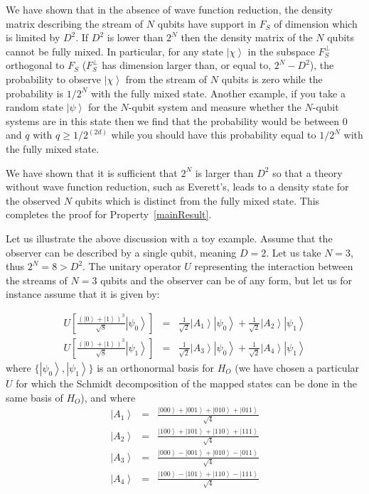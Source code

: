 \documentclass[11pt,amsmath,amssymb,latexsym,a4paper]{article}
\newcommand{\ket}[1]{\left|{#1}\right>}
\newcommand{\highlight}[1] {#1}
\begin{document}
We have shown that in the absence of wave function reduction, the density matrix describing the stream of $N$ qubits have support in $F_S$ of dimension which is limited by $D^2$. If $D^2$ is lower than $2^N$ then the density matrix of the $N$ qubits cannot be fully mixed. In particular, for any state $\ket{\chi}$ in the subspace $F_S^\perp$ orthogonal to $F_S$ ($F_S^\perp$ has dimension larger than, or equal to, $2^N-D^2$), the probability to observe $\ket{\chi}$ from the stream of $N$ qubits is zero while the probability is $1/2^N$ with the fully mixed state. \highlight{Another example, if you take a random state $\ket{\psi}$ for the $N$-qubit system and measure whether the $N$-qubit systems are in this state then we find that the probability would be between 0 and $q$ with $q \geq 1/2^{(2d)}$ while you should have this probability equal to $1/2^N$ with the fully mixed state.}

We have shown that it is sufficient that $2^N$ is larger than $D^2$ so that a theory without wave function reduction, such as Everett's, leads to a density state for the observed $N$ qubits which is distinct from the fully mixed state. This completes the proof for Property~\ref{mainResult}.

Let us illustrate the above discussion with a toy example. Assume that the observer can be described by a single qubit, meaning $D=2$. Let us take $N=3$, thus $2^N = 8 > D^2$. The unitary operator $U$ representing the interaction between the streams of $N=3$ qubits and the observer can be of any form, but let us for instance assume that it is given by:


\begin{eqnarray}
U \highlight{\left[\frac{(\ket{0}+\ket{1})^3}{\sqrt{8}}\ket{\psi_0}\right]} &=&  \frac{1}{\sqrt{2}}\ket{A_1}\ket{\psi_0} +  \frac{1}{\sqrt{2}}\ket{A_2}\ket{\psi_1}\label{Ex1}\\
U \highlight{\left[\frac{(\ket{0}+\ket{1})^3}{\sqrt{8}}\ket{\psi_1} \right]}&=&  \frac{1}{\sqrt{2}}\ket{A_3}\ket{\psi_0} +  \frac{1}{\sqrt{2}}\ket{A_4}\ket{\psi_1}\label{Ex2}
\end{eqnarray}
where $\{\ket{\psi_0},\ket{\psi_1}\}$ is an orthonormal basis for $H_O$ (we have chosen a particular $U$ for which the Schmidt decomposition of the mapped states can be done in the same basis of $H_O$), and where
\begin{eqnarray}
\ket{A_1} &=&\frac{\ket{000}+\ket{001}+\ket{010}+\ket{011}}{\sqrt{4}}\\
\ket{A_2} &=& \frac{\ket{100}+\ket{101}+\ket{110}+\ket{111}}{\sqrt{4}}\\
\ket{A_3} &=& \frac{\ket{000}-\ket{001}+\ket{010}-\ket{011}}{\sqrt{4}}\\
\ket{A_4} &=& \frac{\ket{100}-\ket{101}+\ket{110}-\ket{111}}{\sqrt{4}} 
\end{eqnarray}
\end{document}
